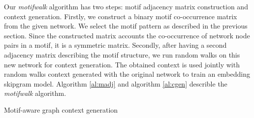 \documentclass{article}
\theoremstyle{definition}
\begin{document}
Our \emph{motifwalk} algorithm has two steps: motif adjacency matrix
construction and context generation. Firstly, we construct a binary
motif co-occurrence matrix from the given network. We select the motif
pattern as described in the previous section. Since the constructed matrix 
accounts the co-occurrence of network node pairs in a motif, it is a symmetric
matrix. Secondly, after having a second adjacency matrix describing the
motif structure, we run random walks on this new network for context generation. 
The obtained context is used jointly with random walks context generated with 
the original network to train an embedding skipgram model. Algorithm \ref{al:madj}
and algorithm \ref{al:cgen} describle the \emph{motifwalk} algorithm.
\begin{algorithm}[h] \label{al:cgen}
\caption{Motif-aware graph context generation}
\end{algorithm}
\end{document}
